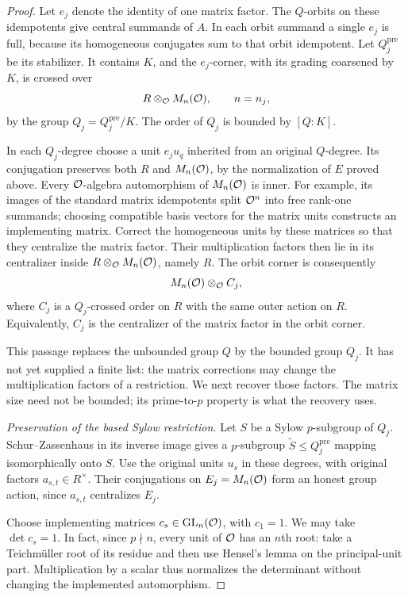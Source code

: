 \begin{proof}
Let $e_j$ denote the identity of one matrix factor.  The
$Q$-orbits on these idempotents give central summands of
$A$.  In each orbit summand a single $e_j$ is full, because
its homogeneous conjugates sum to that orbit idempotent.
Let $Q_j^{\mathrm{pre}}$ be its stabilizer.  It contains
$K$, and the $e_j$-corner, with its grading coarsened by
$K$, is crossed over
\[
 R\otimes_{\mathcal O}M_n(\mathcal O),\qquad n=n_j,
\]
by the group $Q_j=Q_j^{\mathrm{pre}}/K$.  The order of $Q_j$
is bounded by $[Q:K]$.

In each $Q_j$-degree choose a unit $e_ju_q$ inherited from
an original $Q$-degree.  Its conjugation preserves both $R$
and $M_n(\mathcal O)$, by the normalization of $E$ proved above.
Every $\mathcal O$-algebra automorphism of
$M_n(\mathcal O)$ is inner.  For example, its images of the standard
matrix idempotents split $\mathcal O^n$ into free rank-one summands;
choosing compatible basis vectors for the matrix units
constructs an implementing matrix.  Correct the homogeneous
units by these matrices so that they centralize the matrix
factor.  Their multiplication factors then lie in its
centralizer inside $R\otimes_{\mathcal O}M_n(\mathcal O)$, namely $R$.
The orbit corner is consequently
\[
 M_n(\mathcal O)\otimes_{\mathcal O}C_j,
\]
where $C_j$ is a $Q_j$-crossed order on $R$ with the same
outer action on $R$.  Equivalently, $C_j$ is the centralizer
of the matrix factor in the orbit corner.

This passage replaces the unbounded group $Q$ by the bounded group
$Q_j$.  It has not yet supplied a finite list: the matrix corrections
may change the multiplication factors of a restriction.  We next
recover those factors.  The matrix size need not be bounded; its
prime-to-$p$ property is what the recovery uses.

\emph{Preservation of the based Sylow restriction.}
Let $S$ be a Sylow $p$-subgroup of $Q_j$.  Schur--Zassenhaus
in its inverse image gives a $p$-subgroup
$\widetilde S\leq Q_j^{\mathrm{pre}}$ mapping isomorphically
onto $S$.  Use the original units $u_s$ in these degrees,
with original factors $a_{s,t}\in R^\times$.  Their
conjugations on $E_j=M_n(\mathcal O)$ form an honest group action,
since $a_{s,t}$ centralizes $E_j$.

Choose implementing matrices $c_s\in\mathrm{GL}_n(\mathcal O)$,
with $c_1=1$.  We may take $\det c_s=1$.  In fact, since
$p\nmid n$, every unit of $\mathcal O$ has an $n$th root: take a
Teichm\"uller root of its residue and then use Hensel's
lemma on the principal-unit part.  Multiplication by a
scalar thus normalizes the determinant without changing
the implemented automorphism.


\end{proof}
